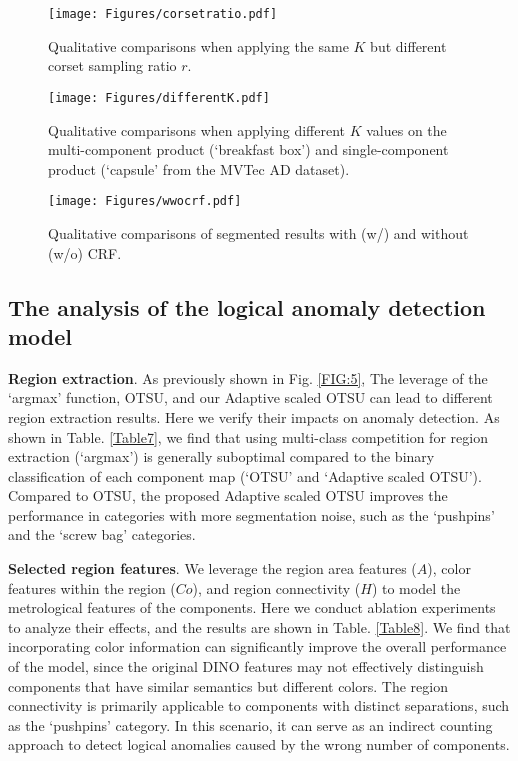 \documentclass[final,5p,times,twocolumn]{elsarticle}
\begin{document}
\begin{figure}
\centering
		\texttt{[image: Figures/corsetratio.pdf]}\caption{Qualitative comparisons when applying the same $K$ but different corset sampling ratio $r$. }
	\label{FIG:13}
\end{figure}

\begin{figure}
\centering
		\texttt{[image: Figures/differentK.pdf]}\caption{Qualitative comparisons when applying different $K$ values on the multi-component product (`breakfast box') and single-component product (`capsule' from the MVTec AD dataset).}
	\label{FIG:14}
\end{figure}

\begin{figure}
\centering
		\texttt{[image: Figures/wwocrf.pdf]}\caption{Qualitative comparisons of segmented results with (w/) and without (w/o) CRF.}
	\label{FIG:15}
\end{figure}



\subsection{The analysis of the logical anomaly detection model}
\label{5.4}
\textbf{Region extraction}. As previously shown in Fig. \ref{FIG:5}, The leverage of the `argmax' function, OTSU, and our Adaptive scaled OTSU can lead to different region extraction results. Here we verify their impacts on anomaly detection. As shown in Table. \ref{Table7}, we find that using multi-class competition for region extraction (`argmax') is generally suboptimal compared to the binary classification of each component map (`OTSU' and `Adaptive scaled OTSU'). Compared to OTSU, the proposed Adaptive scaled OTSU improves the performance in categories with more segmentation noise, such as the `pushpins' and the `screw bag' categories.

\textbf{Selected region features}. We leverage the region area features ($A$), color features within the region ($Co$), and region connectivity ($H$) to model the metrological features of the components. Here we conduct ablation experiments to analyze their effects, and the results are shown in Table. \ref{Table8}. We find that incorporating color information can significantly improve the overall performance of the model, since the original DINO features may not effectively distinguish components that have similar semantics but different colors. The region connectivity is primarily applicable to components with distinct separations, such as the `pushpins' category. In this scenario, it can serve as an indirect counting approach to detect logical anomalies caused by the wrong number of components.
\end{document}
